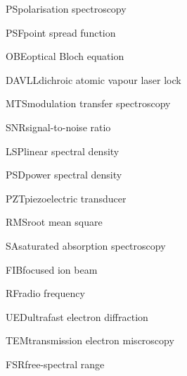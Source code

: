     {PS}{polarisation spectroscopy}

    {PSF}{point spread function}

    {OBE}{optical Bloch equation}
    
    {DAVLL}{dichroic atomic vapour laser lock}

    {MTS}{modulation transfer spectroscopy}

    {SNR}{signal-to-noise ratio}

    {LSP}{linear spectral density}
    
    {PSD}{power spectral density}
    
    {PZT}{piezoelectric transducer}

    {RMS}{root mean square}
    
    {SA}{saturated absorption spectroscopy}

    {FIB}{focused ion beam}

    {RF}{radio frequency}
    
    {UED}{ultrafast electron diffraction}

    {TEM}{transmission electron miscroscopy}

    {FSR}{free-spectral range}